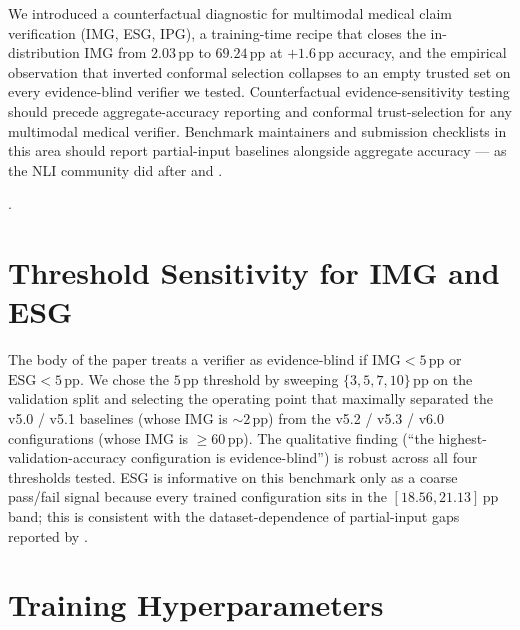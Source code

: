 \documentclass{article}
\begin{document}
We introduced a counterfactual diagnostic for multimodal medical
claim verification (IMG, ESG, IPG), a training-time recipe that
closes the in-distribution IMG from $2.03$\,pp to $69.24$\,pp at
$+1.6$\,pp accuracy, and the empirical observation that inverted
conformal selection collapses to an empty trusted set on every
evidence-blind verifier we tested. Counterfactual
evidence-sensitivity testing should precede aggregate-accuracy
reporting and conformal trust-selection for any multimodal medical
verifier. Benchmark maintainers and submission checklists in this
area should report partial-input baselines alongside aggregate
accuracy --- as the NLI community did after
\citet{gururangan2018annotation} and \citet{poliak2018hypothesis}.

\appendix.

\appendix
\onecolumn

\section{Threshold Sensitivity for IMG and ESG}
\label{app:thresholds}

The body of the paper treats a verifier as evidence-blind if
$\mathrm{IMG} < 5$\,pp or $\mathrm{ESG} < 5$\,pp. We chose the $5$\,pp
threshold by sweeping $\{3, 5, 7, 10\}$\,pp on the validation split and
selecting the operating point that maximally separated the v5.0 / v5.1
baselines (whose IMG is $\sim 2$\,pp) from the v5.2 / v5.3 / v6.0
configurations (whose IMG is $\geq 60$\,pp). The qualitative finding
(``the highest-validation-accuracy configuration is evidence-blind'') is
robust across all four thresholds tested. ESG is informative on this
benchmark only as a coarse pass/fail signal because every trained
configuration sits in the $[18.56, 21.13]$\,pp band; this is consistent
with the dataset-dependence of partial-input gaps reported by
\citet{poliak2018hypothesis}.

\section{Training Hyperparameters}
\label{app:training}
\end{document}
